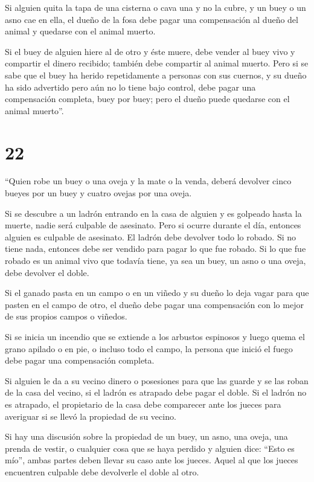  Si alguien quita la tapa de una cisterna o cava una y no
la cubre, y un buey o un asno cae en ella,  el dueño de la
fosa debe pagar una compensación al dueño del animal y quedarse con el
animal muerto.

 Si el buey de alguien hiere al de otro y éste muere, debe
vender al buey vivo y compartir el dinero recibido; también debe
compartir al animal muerto.  Pero si se sabe que el buey ha
herido repetidamente a personas con sus cuernos, y su dueño ha sido
advertido pero aún no lo tiene bajo control, debe pagar una compensación
completa, buey por buey; pero el dueño puede quedarse con el animal
muerto''.

\hypertarget{section-21}{%
\section{22}\label{section-21}}

 ``Quien robe un buey o una oveja y la mate o la venda,
deberá devolver cinco bueyes por un buey y cuatro ovejas por una oveja.

 Si se descubre a un ladrón entrando en la casa de alguien y
es golpeado hasta la muerte, nadie será culpable de asesinato.
 Pero si ocurre durante el día, entonces alguien es culpable
de asesinato. El ladrón debe devolver todo lo robado. Si no tiene nada,
entonces debe ser vendido para pagar lo que fue robado.  Si
lo que fue robado es un animal vivo que todavía tiene, ya sea un buey,
un asno o una oveja, debe devolver el doble.

 Si el ganado pasta en un campo o en un viñedo y su dueño lo
deja vagar para que pasten en el campo de otro, el dueño debe pagar una
compensación con lo mejor de sus propios campos o viñedos.

 Si se inicia un incendio que se extiende a los arbustos
espinosos y luego quema el grano apilado o en pie, o incluso todo el
campo, la persona que inició el fuego debe pagar una compensación
completa.

 Si alguien le da a su vecino dinero o posesiones para que
las guarde y se las roban de la casa del vecino, si el ladrón es
atrapado debe pagar el doble.  Si el ladrón no es atrapado,
el propietario de la casa debe comparecer ante los jueces para averiguar
si se llevó la propiedad de su vecino.

 Si hay una discusión sobre la propiedad de un buey, un
asno, una oveja, una prenda de vestir, o cualquier cosa que se haya
perdido y alguien dice: ``Esto es mío'', ambas partes deben llevar su
caso ante los jueces. Aquel al que los jueces encuentren culpable debe
devolverle el doble al otro.

